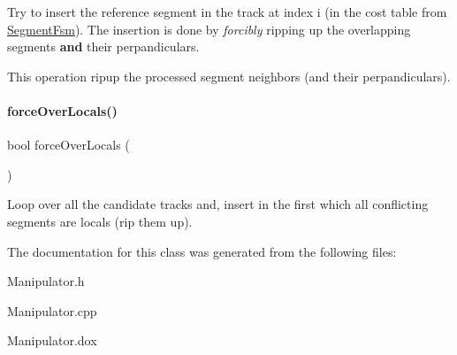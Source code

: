 Try to insert the reference segment in the track at index {\ttfamily i} (in the cost table from \mbox{\hyperlink{classKite_1_1SegmentFsm}{Segment\+Fsm}}). The insertion is done by {\itshape forcibly} ripping up the overlapping segments {\bfseries and} their perpandiculars.

This operation ripup the processed segment neighbors (and their perpandiculars). \mbox{\label{classKite_1_1Manipulator_add26b688d75a99a1ae781787eead08d5}} 
\paragraph{\texorpdfstring{force\+Over\+Locals()}{forceOverLocals()}}
{\footnotesize\ttfamily bool force\+Over\+Locals (\begin{DoxyParamCaption}{ }\end{DoxyParamCaption})}

Loop over all the candidate tracks and, insert in the first which all conflicting segments are locals (rip them up). 

The documentation for this class was generated from the following files\+:\begin{DoxyCompactItemize}
\item 
Manipulator.\+h\item 
Manipulator.\+cpp\item 
Manipulator.\+dox\end{DoxyCompactItemize}
